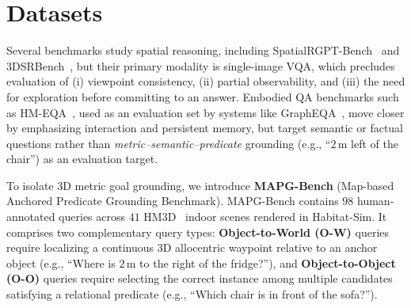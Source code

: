 \section{Datasets}
\label{sec:datasets}

Several benchmarks study spatial reasoning, including SpatialRGPT-Bench~\cite{spatialRGPT} and $3$DSRBench~\cite{3dsrbench}, but their primary modality is single-image VQA, which precludes evaluation of (i) viewpoint consistency, (ii) partial observability, and (iii) the need for exploration before committing to an answer. Embodied QA benchmarks such as HM-EQA~\cite{ren2024exploreconfidentefficientexploration}, used as an evaluation set by systems like GraphEQA~\cite{graphEQA}, %
move closer by emphasizing interaction and persistent memory, but target semantic or factual questions rather than \emph{metric--semantic--predicate} grounding (e.g., ``$2\,\mathrm{m}$ left of the chair'') as an evaluation target.

To isolate $3$D metric goal grounding, we introduce \textbf{MAPG-Bench} (Map-based Anchored Predicate Grounding Benchmark). MAPG-Bench contains $98$ human-annotated queries across $41$ HM$3$D~\cite{ramakrishnan2021habitatmatterport3ddatasethm3d} indoor scenes rendered in Habitat-Sim. %
It comprises two complementary query types: \textbf{Object-to-World (O-W)} queries require localizing a continuous $3$D allocentric waypoint relative to an anchor object (e.g., ``Where is $2\,\mathrm{m}$ to the right of the fridge?''), and \textbf{Object-to-Object (O-O)} queries require selecting the correct instance among multiple candidates satisfying a relational predicate (e.g., ``Which chair is in front of the sofa?''). 

